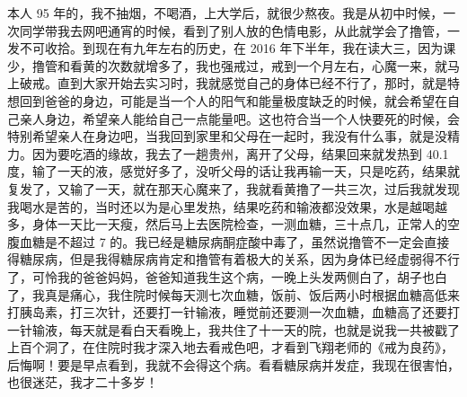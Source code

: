 \begin{case}
    本人 95 年的，我不抽烟，不喝酒，上大学后，就很少熬夜。我是从初中时候，一次同学带我去网吧通宵的时候，看到了别人放的色情电影，从此就学会了撸管，一发不可收拾。到现在有九年左右的历史，在 2016 年下半年，我在读大三，因为课少，撸管和看黄的次数就增多了，我也强戒过，戒到一个月左右，心魔一来，就马上破戒。直到大家开始去实习时，我就感觉自己的身体已经不行了，那时，就是特想回到爸爸的身边，可能是当一个人的阳气和能量极度缺乏的时候，就会希望在自己亲人身边，希望亲人能给自己一点能量吧。这也符合当一个人快要死的时候，会特别希望亲人在身边吧，当我回到家里和父母在一起时，我没有什么事，就是没精力。因为要吃酒的缘故，我去了一趟贵州，离开了父母，结果回来就发热到 40.1 度，输了一天的液，感觉好多了，没听父母的话让我再输一天，只是吃药，结果就复发了，又输了一天，就在那天心魔来了，我就看黄撸了一共三次，过后我就发现我喝水是苦的，当时还以为是心里发热，结果吃药和输液都没效果，水是越喝越多，身体一天比一天瘦，然后马上去医院检查，一测血糖，三十点几，正常人的空腹血糖是不超过 7 的。我已经是糖尿病酮症酸中毒了，虽然说撸管不一定会直接得糖尿病，但是我得糖尿病肯定和撸管有着极大的关系，因为身体已经虚弱得不行了，可怜我的爸爸妈妈，爸爸知道我生这个病，一晚上头发两侧白了，胡子也白了，我真是痛心，我住院时候每天测七次血糖，饭前、饭后两小时根据血糖高低来打胰岛素，打三次针，还要打一针输液，睡觉前还要测一次血糖，血糖高了还要打一针输液，每天就是看白天看晚上，我共住了十一天的院，也就是说我一共被戳了上百个洞了，在住院时我才深入地去看戒色吧，才看到飞翔老师的《戒为良药》，后悔啊！要是早点看到，我就不会得这个病。看看糖尿病并发症，我现在很害怕，也很迷茫，我才二十多岁！


\end{case}
